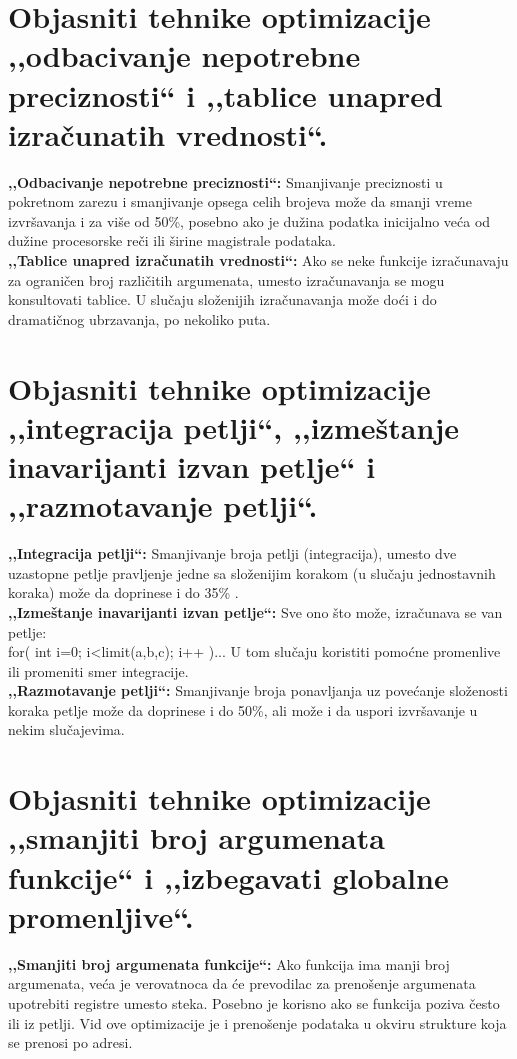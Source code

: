 \documentclass[a4paper]{article}
\begin{document}
\section{Objasniti tehnike optimizacije ,,odbacivanje nepotrebne preciznosti`` i 
         ,,tablice unapred izračunatih vrednosti``.}
  \textbf{,,Odbacivanje nepotrebne preciznosti``:} Smanjivanje preciznosti u pokretnom zarezu i 
  smanjivanje opsega celih brojeva može da smanji vreme izvršavanja i za više od 50\%, 
  posebno ako je dužina podatka inicijalno veća od dužine 
  procesorske reči ili širine magistrale podataka.\\
  \indent \textbf{,,Tablice unapred izračunatih vrednosti``:} Ako se neke funkcije izračunavaju za 
  ograničen broj različitih argumenata, umesto izračunavanja se mogu konsultovati tablice. U slučaju 
  složenijih izračunavanja može doći i do dramatičnog ubrzavanja, po nekoliko puta.

\section{Objasniti tehnike optimizacije ,,integracija petlji``, ,,izmeštanje inavarijanti izvan petlje``
         i ,,razmotavanje petlji``.}
  
  \textbf{,,Integracija petlji``:} Smanjivanje broja petlji (integracija), umesto dve uzastopne 
  petlje pravljenje jedne sa složenijim korakom (u slučaju jednostavnih koraka) može da doprinese i 
  do 35\% . \\
  
  \textbf{,,Izmeštanje inavarijanti izvan petlje``:} Sve ono što može, izračunava se van petlje:\\
  \indent for( int i=0; i<limit(a,b,c); i++ )... U tom slučaju koristiti pomoćne promenlive ili
  promeniti smer integracije. \\

  \textbf{,,Razmotavanje petlji``:} Smanjivanje broja ponavljanja uz povećanje složenosti koraka petlje može da doprinese i do 50\%, 
  ali može i da uspori izvršavanje u nekim slučajevima.
  
\section{Objasniti tehnike optimizacije ,,smanjiti broj argumenata funkcije`` i 
         ,,izbegavati globalne promenljive``.}
  \textbf{,,Smanjiti broj argumenata funkcije``:} Ako funkcija ima manji broj argumenata, 
  veća je verovatnoca da će prevodilac za prenošenje argumenata upotrebiti registre umesto steka. 
  Posebno je korisno ako se funkcija poziva često ili iz petlji. 
  Vid ove optimizacije je i prenošenje podataka u okviru strukture koja se prenosi po adresi.\\
  
\end{document}
